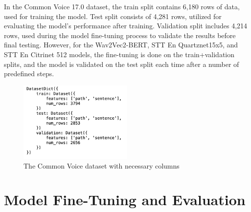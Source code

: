 \documentclass[conference]{IEEEtran}
\begin{document}
In the Common Voice 17.0 dataset, the train split contains 6,180 rows of data, used for training the model. Test split consists of 4,281 rows, utilized for evaluating the model’s performance after training. Validation split includes 4,214 rows, used during the model fine-tuning process to validate the results before final testing. However, for the Wav2Vec2-BERT, STT En Quartznet15x5, and STT En Citrinet 512 models, the fine-tuning is done on the train+validation splits, and the model is validated on the test split each time after a number of predefined steps.

\setlength{\belowcaptionskip}{-10pt}

\begin{figure}[ht]
\centering
\includegraphics[width=0.5\textwidth]{4.png}
\caption{The Common Voice dataset with necessary columns}
\label{fig:whisper_asr_architecture}
\end{figure}

\section{Model Fine-Tuning and Evaluation}
\end{document}
